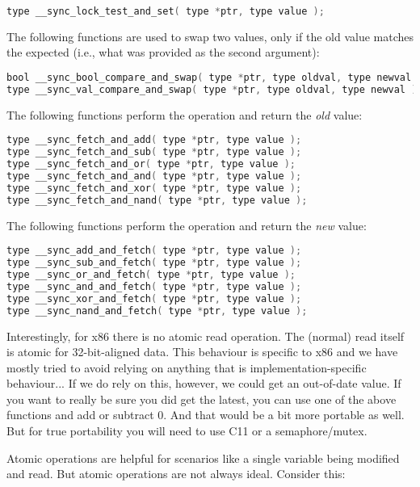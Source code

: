 \begin{lstlisting}[language=C]
type __sync_lock_test_and_set( type *ptr, type value );
\end{lstlisting}


The following functions are used to swap two values, only if the old value matches the expected (i.e., what was provided as the second argument):

\begin{lstlisting}[language=C]
bool __sync_bool_compare_and_swap( type *ptr, type oldval, type newval );
type __sync_val_compare_and_swap( type *ptr, type oldval, type newval );
\end{lstlisting}


The following functions perform the operation and return the \textit{old} value:
\begin{lstlisting}[language=C]
type __sync_fetch_and_add( type *ptr, type value );
type __sync_fetch_and_sub( type *ptr, type value );
type __sync_fetch_and_or( type *ptr, type value );
type __sync_fetch_and_and( type *ptr, type value );
type __sync_fetch_and_xor( type *ptr, type value );
type __sync_fetch_and_nand( type *ptr, type value );
\end{lstlisting}

The following functions perform the operation and return the \textit{new} value:
\begin{lstlisting}[language=C]
type __sync_add_and_fetch( type *ptr, type value );
type __sync_sub_and_fetch( type *ptr, type value );
type __sync_or_and_fetch( type *ptr, type value );
type __sync_and_and_fetch( type *ptr, type value );
type __sync_xor_and_fetch( type *ptr, type value );
type __sync_nand_and_fetch( type *ptr, type value );
\end{lstlisting}



Interestingly, for x86 there is no atomic read operation. The (normal) read itself is atomic for 32-bit-aligned data. This behaviour is specific to x86 and we have mostly tried to avoid relying on anything that is implementation-specific behaviour... If we do rely on this, however, we could get an out-of-date value. If you want to really be sure you did get the latest, you can use one of the above functions and add or subtract 0. And that would be a bit more portable as well. But for true portability you will need to use C11 or a semaphore/mutex.

Atomic operations are helpful for scenarios like a single variable being modified and read. But atomic operations are not always ideal. Consider this:


